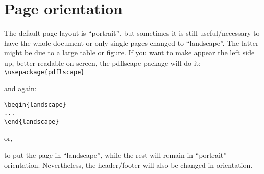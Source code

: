 \section{Page orientation}

\begin{sloppypar}
The default page layout is ``portrait'', but sometimes it is still useful/necessary to have the whole document or only single pages changed to ``landscape''. The latter might be due to a large table or figure. If you want to make appear the left side up, better readable on screen, the pdflscape-package will do it:
\verb!\usepackage{pdflscape}!
\end{sloppypar}
and again:
\begin{verbatim}
\begin{landscape}
...
\end{landscape}
\end{verbatim}

or, 
\verb!!

to put the page in ``landscape'', while the rest will remain in ``portrait'' orientation. Nevertheless, the header/footer will also be changed in orientation.


